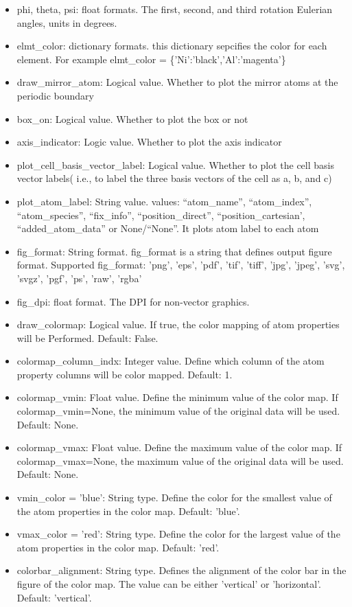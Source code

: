 \documentclass[12pt]{book}
\begin{document}
\begin{itemize}
\item phi, theta, psi: float formats. The first, second, and third rotation Eulerian angles, units in degrees.
\item elmt\_color: dictionary formats. this dictionary sepcifies the color for each element. For example elmt\_color = \{'Ni':'black','Al':'magenta'\}
\item draw\_mirror\_atom: Logical value. Whether to plot the mirror atoms at the periodic boundary
\item box\_on: Logical value. Whether to plot the box or not
\item axis\_indicator: Logic value. Whether to plot the axis indicator
\item plot\_cell\_basis\_vector\_label: Logical value. Whether to plot the cell basis vector labels( i.e., to label the three basis vectors of the cell as a, b, and c)
\item plot\_atom\_label: String value. values: ``atom\_name'', ``atom\_index'', ``atom\_species'', ``fix\_info'', ``position\_direct'', ``position\_cartesian', ``added\_atom\_data'' or None/``None''. It plots atom label to each atom
\item fig\_format: String format. fig\_format is a string that defines output figure format. Supported fig\_format: 'png', 'eps', 'pdf', 'tif', 'tiff', 'jpg', 'jpeg', 'svg', 'svgz', 'pgf', 'ps', 'raw', 'rgba'
\item fig\_dpi: float format. The DPI for non-vector graphics.
\item draw\_colormap: Logical value. If true, the color mapping of atom properties will be Performed. Default: False.
\item colormap\_column\_indx: Integer value. Define which column of the atom property columns will be color mapped. Default: 1.
\item colormap\_vmin: Float value. Define the minimum value of the color map. If colormap\_vmin=None, the minimum value of the original data will be used. Default: None.
\item colormap\_vmax: Float value. Define the maximum value of the color map. If colormap\_vmax=None, the maximum value of the original data will be used. Default: None.
\item vmin\_color = 'blue': String type. Define the color for the smallest value of the atom properties in the color map. Default: 'blue'.
\item vmax\_color = 'red': String type. Define the color for the largest value of the atom properties in the color map. Default: 'red'.
\item colorbar\_alignment: String type. Defines the alignment of the color bar in the figure of the color map. The value can be either 'vertical' or 'horizontal'. Default: 'vertical'.
\end{itemize}
\end{document}
